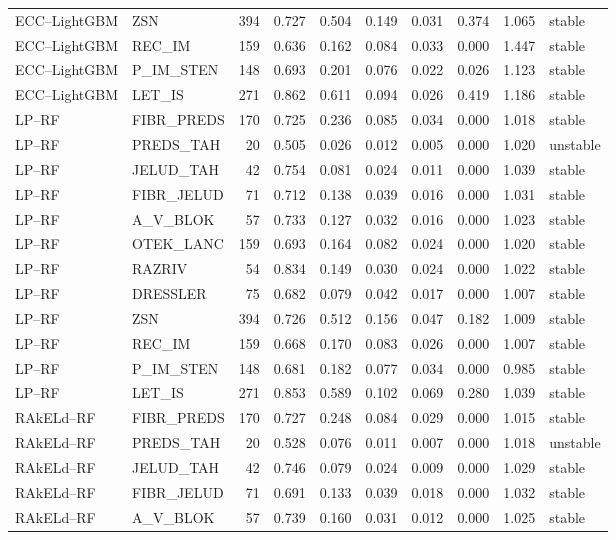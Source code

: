 \begin{longtable}{llrrrrrrrl}
ECC--LightGBM & ZSN & 394 & 0.727 & 0.504 & 0.149 & 0.031 & 0.374 & 1.065 & stable \\
ECC--LightGBM & REC\_IM & 159 & 0.636 & 0.162 & 0.084 & 0.033 & 0.000 & 1.447 & stable \\
ECC--LightGBM & P\_IM\_STEN & 148 & 0.693 & 0.201 & 0.076 & 0.022 & 0.026 & 1.123 & stable \\
ECC--LightGBM & LET\_IS & 271 & 0.862 & 0.611 & 0.094 & 0.026 & 0.419 & 1.186 & stable \\
LP--RF & FIBR\_PREDS & 170 & 0.725 & 0.236 & 0.085 & 0.034 & 0.000 & 1.018 & stable \\
LP--RF & PREDS\_TAH & 20 & 0.505 & 0.026 & 0.012 & 0.005 & 0.000 & 1.020 & unstable \\
LP--RF & JELUD\_TAH & 42 & 0.754 & 0.081 & 0.024 & 0.011 & 0.000 & 1.039 & stable \\
LP--RF & FIBR\_JELUD & 71 & 0.712 & 0.138 & 0.039 & 0.016 & 0.000 & 1.031 & stable \\
LP--RF & A\_V\_BLOK & 57 & 0.733 & 0.127 & 0.032 & 0.016 & 0.000 & 1.023 & stable \\
LP--RF & OTEK\_LANC & 159 & 0.693 & 0.164 & 0.082 & 0.024 & 0.000 & 1.020 & stable \\
LP--RF & RAZRIV & 54 & 0.834 & 0.149 & 0.030 & 0.024 & 0.000 & 1.022 & stable \\
LP--RF & DRESSLER & 75 & 0.682 & 0.079 & 0.042 & 0.017 & 0.000 & 1.007 & stable \\
LP--RF & ZSN & 394 & 0.726 & 0.512 & 0.156 & 0.047 & 0.182 & 1.009 & stable \\
LP--RF & REC\_IM & 159 & 0.668 & 0.170 & 0.083 & 0.026 & 0.000 & 1.007 & stable \\
LP--RF & P\_IM\_STEN & 148 & 0.681 & 0.182 & 0.077 & 0.034 & 0.000 & 0.985 & stable \\
LP--RF & LET\_IS & 271 & 0.853 & 0.589 & 0.102 & 0.069 & 0.280 & 1.039 & stable \\
RAkELd--RF & FIBR\_PREDS & 170 & 0.727 & 0.248 & 0.084 & 0.029 & 0.000 & 1.015 & stable \\
RAkELd--RF & PREDS\_TAH & 20 & 0.528 & 0.076 & 0.011 & 0.007 & 0.000 & 1.018 & unstable \\
RAkELd--RF & JELUD\_TAH & 42 & 0.746 & 0.079 & 0.024 & 0.009 & 0.000 & 1.029 & stable \\
RAkELd--RF & FIBR\_JELUD & 71 & 0.691 & 0.133 & 0.039 & 0.018 & 0.000 & 1.032 & stable \\
RAkELd--RF & A\_V\_BLOK & 57 & 0.739 & 0.160 & 0.031 & 0.012 & 0.000 & 1.025 & stable \\

\end{longtable}
